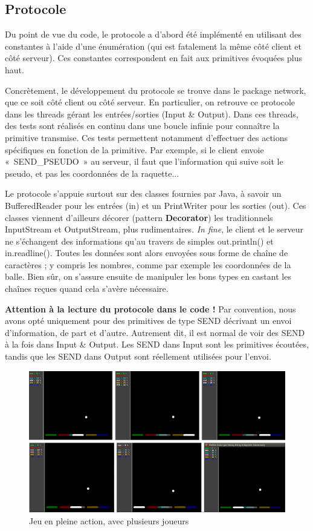 \documentclass[a4paper,12pt]{article}
\begin{document}
\subsection{Protocole}

Du point de vue du code, le protocole a d'abord été implémenté en utilisant des constantes à l'aide d'une énumération (qui est fatalement la même côté client et côté serveur). Ces constantes correspondent en fait aux primitives évoquées plus haut.

Concrètement, le développement du protocole se trouve dans le package network, que ce soit côté client ou côté serveur. En particulier, on retrouve ce protocole dans les threads gérant les entrées/sorties (Input \& Output). Dans ces threads, des tests sont réalisés en continu dans une boucle infinie pour connaître la primitive transmise. Ces tests permettent notamment d'effectuer des actions spécifiques en fonction de la primitive. Par exemple, si le client envoie «~SEND\_PSEUDO~» au serveur, il faut que l'information qui suive soit le pseudo, et pas les coordonnées de la raquette...

Le protocole s'appuie surtout sur des classes fournies par Java, à savoir un BufferedReader pour les entrées (in) et un PrintWriter pour les sorties (out). Ces classes viennent d'ailleurs décorer (pattern \textbf{Decorator}) les traditionnels InputStream et OutputStream, plus rudimentaires. \textit{In fine}, le client et le serveur ne s'échangent des informations qu'au travers de simples out.println() et in.readline(). Toutes les données sont alors envoyées sous forme de chaîne de caractères ; y compris les nombres, comme par exemple les coordonnées de la balle. Bien sûr, on s'assure ensuite de manipuler les bons types en castant les chaînes reçues quand cela s'avère nécessaire.

\textbf{Attention à la lecture du protocole dans le code !} Par convention, nous avons opté uniquement pour des primitives de type SEND décrivant un envoi d'information, de part et d'autre. Autrement dit, il est normal de voir des SEND à la fois dans Input \& Output. Les SEND dans Input sont les primitives écoutées, tandis que les SEND dans Output sont réellement utilisées pour l'envoi.

\begin{landscape}
  \begin{figure}
  \begin{center}
    \includegraphics[scale=.3]{multiplayer.png}
  \end{center}
  \caption{Jeu en pleine action, avec plusieurs joueurs}
  \end{figure}
\end{landscape}
\end{document}
